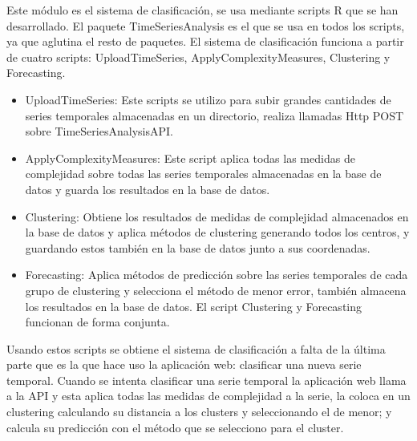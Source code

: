 \documentclass[14pt]{extarticle}
\theoremstyle{definition}
\theoremstyle{remark}
\begin{document}
Este módulo es el sistema de clasificación, se usa mediante scripts R que se han desarrollado. El paquete TimeSeriesAnalysis es el que se usa en todos los scripts, ya que aglutina el resto de paquetes. El sistema de clasificación funciona a partir de cuatro scripts: UploadTimeSeries, ApplyComplexityMeasures, Clustering y Forecasting.
\begin{itemize}
	\item UploadTimeSeries: Este scripts se utilizo para subir grandes cantidades de series temporales almacenadas en un directorio, realiza llamadas Http POST sobre TimeSeriesAnalysisAPI.
	\item ApplyComplexityMeasures: Este script aplica todas las medidas de complejidad sobre todas las series temporales almacenadas en la base de datos y guarda los resultados en la base de datos.
	\item Clustering: Obtiene los resultados de medidas de complejidad almacenados en la base de datos y aplica métodos de clustering generando todos los centros, y guardando estos también en la base de datos junto a sus coordenadas.
	\item Forecasting: Aplica métodos de predicción sobre las series temporales de cada grupo de clustering y selecciona el método de menor error, también almacena los resultados en la base de datos. El script Clustering y Forecasting funcionan de forma conjunta.
\end{itemize}
Usando estos scripts se obtiene el sistema de clasificación a falta de la última parte que es la que hace uso la aplicación web: clasificar una nueva serie temporal. Cuando se intenta clasificar una serie temporal la aplicación web llama a la API y esta aplica todas las medidas de complejidad a la serie, la coloca en un clustering calculando su distancia a los clusters y seleccionando el de menor; y calcula su predicción con el método que se selecciono para el cluster.
\end{document}
